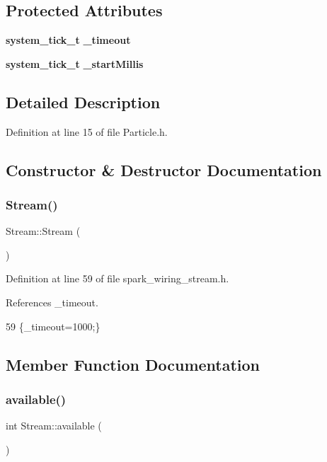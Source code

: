 \subsection*{Protected Attributes}
\begin{DoxyCompactItemize}
\item 
\textbf{ system\+\_\+tick\+\_\+t} \textbf{ \+\_\+timeout}
\item 
\textbf{ system\+\_\+tick\+\_\+t} \textbf{ \+\_\+start\+Millis}
\end{DoxyCompactItemize}


\subsection{Detailed Description}


Definition at line 15 of file Particle.\+h.



\subsection{Constructor \& Destructor Documentation}
\mbox{\label{class_stream_a8c3f05bd00361ec92627fa41f330a39b}} 
\subsubsection{Stream()}
{\footnotesize\ttfamily Stream\+::\+Stream (\begin{DoxyParamCaption}{ }\end{DoxyParamCaption})\hspace{0.3cm}{\ttfamily [inline]}}



Definition at line 59 of file spark\+\_\+wiring\+\_\+stream.\+h.



References \+\_\+timeout.


\begin{DoxyCode}
59 \{_timeout=1000;\}
\end{DoxyCode}


\subsection{Member Function Documentation}
\mbox{\label{class_stream_a747aa1d8db334a7b735a48dbc135478c}} 
\subsubsection{available()\hspace{0.1cm}{\footnotesize\ttfamily [1/2]}}
{\footnotesize\ttfamily int Stream\+::available (\begin{DoxyParamCaption}{ }\end{DoxyParamCaption})\hspace{0.3cm}{\ttfamily [inline]}}



